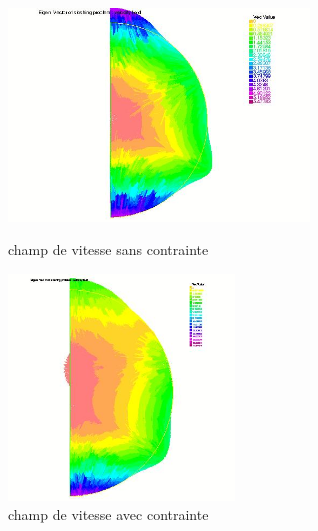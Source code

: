 \documentclass[a4paper]{report}
\begin{document}
\begin{figure}
\begin{minipage}[h!]{0.5\linewidth}
\centering
\includegraphics[width=8cm]{2_3_1_champ_de_vitesse.jpeg}
\caption{champ de vitesse sans contrainte }
\end{minipage}
\begin{minipage}[h!]{0.5\linewidth}
\centering
\includegraphics[width=6cm]{2_3_2_champ_de_vitesse.jpeg}
\caption{champ de vitesse avec contrainte}
\end{minipage}
\end{figure}
\end{document}
